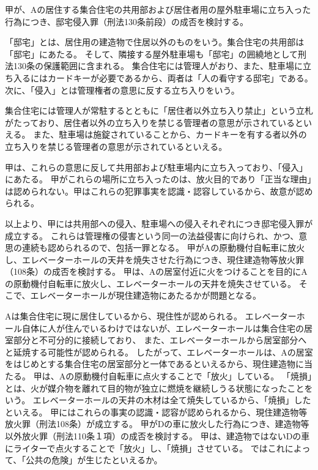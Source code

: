 \documentclass[11pt]{jsarticle}
\title{\vspace{-30mm}{\textgt{\Large{\fbox{9} 紫の炎}}}}
\date{\vspace{-15mm}}
\begin{document}
\maketitle

\sectionA{}
	甲が、Aの居住する集合住宅の共用部および居住者用の屋外駐車場に立ち入った行為につき、邸宅侵入罪（刑法130条前段）の成否を検討する。
	
	\sectionB{}
		「邸宅」とは、居住用の建造物で住居以外のものをいう。集合住宅の共用部は「邸宅」にあたる。
		そして、隣接する屋外駐車場も「邸宅」の囲繞地として刑法130条の保護範囲に含まれる。
		集合住宅には管理人がおり、また、駐車場に立ち入るにはカードキーが必要であるから、両者は「人の看守する邸宅」である。
	\sectionB{}
		次に、「侵入」とは管理権者の意思に反する立ち入りをいう。
		
		集合住宅には管理人が常駐するとともに「居住者以外立ち入り禁止」という立札がたっており、居住者以外の立ち入りを禁じる管理者の意思が示されているといえる。
		また、駐車場は施錠されていることから、カードキーを有する者以外の立ち入りを禁じる管理者の意思が示されているといえる。
		
		甲は、これらの意思に反して共用部および駐車場内に立ち入っており、「侵入」にあたる。
	\sectionB{}
		甲がこれらの場所に立ち入ったのは、放火目的であり「正当な理由」は認められない。甲はこれらの犯罪事実を認識・認容しているから、故意が認められる。
		
		以上より、甲には共用部への侵入、駐車場への侵入それぞれにつき邸宅侵入罪が成立する。
		これらは管理権の侵害という同一の法益侵害に向けられ、かつ、意思の連続も認められるので、包括一罪となる。
\sectionA{}
	甲がAの原動機付自転車に放火し、エレベーターホールの天井を焼失させた行為につき、現住建造物等放火罪（108条）の成否を検討する。
		\sectionB{}
			甲は、Aの居室付近に火をつけることを目的にAの原動機付自転車に放火し、エレベーターホールの天井を焼失させている。
			そこで、エレベーターホールが現住建造物にあたるかが問題となる。
			
			Aは集合住宅に現に居住しているから、現住性が認められる。
			エレベーターホール自体に人が住んでいるわけではないが、エレベーターホールは集合住宅の居室部分と不可分的に接続しており、
			また、エレベーターホールから居室部分へと延焼する可能性が認められる。
			したがって、エレベーターホールは、Aの居室をはじめとする集合住宅の居室部分と一体であるといえるから、現住建造物に当たる。
		\sectionB{}
			甲は、Aの原動機付自転車に点火することで「放火」している。
		\sectionB{}
			「焼損」とは、火が媒介物を離れて目的物が独立に燃焼を継続しうる状態になったことをいう。
			エレベーターホールの天井の木材は全て焼失しているから、「焼損」したといえる。
		\sectionB{}
			甲にはこれらの事実の認識・認容が認められるから、現住建造物等放火罪（刑法108条）が成立する。
\sectionA{}
	甲がDの車に放火した行為につき、建造物等以外放火罪（刑法110条１項）の成否を検討する。
	\sectionB{}
		甲は、建造物ではないDの車にライターで点火することで「放火」し、「焼損」させている。
	\sectionB{}
		ではこれによって、「公共の危険」が生じたといえるか。
		
\end{document}
